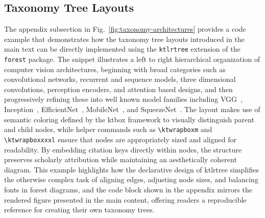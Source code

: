 \documentclass[12pt,onecolumn]{article}
\begin{document}
  \subsection{Taxonomy Tree Layouts}
  \label{sec:taxonomy-tree-layouts}
    The appendix subsection in Fig.~\ref{fig:taxonomy-architectures} provides a code example that demonstrates how the taxonomy tree layouts introduced in the main text can be directly implemented using the \texttt{ktlrtree} extension of the \texttt{forest} package. The snippet illustrates a left to right hierarchical organization of computer vision architectures, beginning with broad categories such as convolutional networks, recurrent and sequence models, three dimensional convolutions, perception encoders, and attention based designs, and then progressively refining these into well known model families including VGG~\cite{2015-simonyank-verydeepconvolutional}, Inception~\cite{2016-szegedyc-rethinkinginceptionarchitecture}, EfficientNet~\cite{2020-tanm-efficientnetrethinkingmodel}, MobileNet~\cite{2019-sandlerm-mobilenetv2invertedresiduals,2019-howarda-searchingmobilenetv3}, and SqueezeNet~\cite{2016-iandolafn-squeezenetalexnetlevelaccuracy}. The layout makes use of semantic coloring defined by the ktbox framework to visually distinguish parent and child nodes, while helper commands such as \verb|\ktwrapboxm| and \verb|\ktwrapboxxxxl| ensure that nodes are appropriately sized and aligned for readability. By embedding citation keys directly within nodes, the structure preserves scholarly attribution while maintaining an aesthetically coherent diagram. This example highlights how the declarative design of ktlrtree simplifies the otherwise complex task of aligning edges, adjusting node sizes, and balancing fonts in forest diagrams, and the code block shown in the appendix mirrors the rendered figure presented in the main content, offering readers a reproducible reference for creating their own taxonomy trees.
\end{document}
